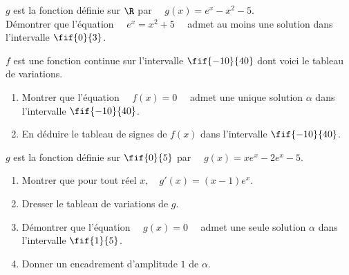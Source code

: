 \documentclass[a4paper,11pt,exos]{nsi} %
\begin{document}
\exo{}
$g$ est la fonction définie sur $\R$ par $\quad g(x)=e^x-x^2-5$.\\
Démontrer que l'équation $\quad e^x=x^2+5\quad$ admet au moins une solution dans l'intervalle $\fif{0}{3}$.

\exo{}
$f$ est une fonction continue sur l'intervalle $\fif{-10}{40}$ dont voici le tableau de variations.
\begin{center}
	\end{center}
\begin{enumerate}
	\item Montrer que l'équation $\quad f(x)=0\quad$ admet une unique solution $\alpha$ dans l'intervalle $\fif{-10}{40}$. 
	\item En déduire le tableau de signes de $f(x)$ dans l'intervalle $\fif{-10}{40}$.
\end{enumerate}

\exo{}
$g$ est la fonction définie sur $\fif{0}{5}$ par $\quad g(x)=xe^x-2e^x-5$.
\begin{enumerate}
	\item Montrer que pour tout réel $x, \quad g'(x)=(x-1)e^x$.
	\item Dresser le tableau de variations de $g$.
	\item Démontrer que l'équation $\quad g(x)=0\quad$ admet une seule solution $\alpha$ dans l'intervalle $\fif{1}{5}$.
	\item Donner un encadrement d'amplitude $1$ de $\alpha$.
\end{enumerate}
\end{document}
